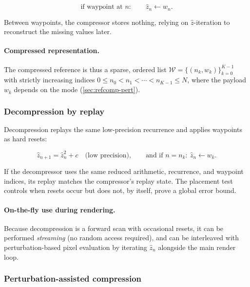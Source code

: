 \begin{equation}
  \text{if waypoint at } n:\qquad \hat z_n \leftarrow w_n.
  \label{eq:waypoint-reset}
\end{equation}

Between waypoints, the compressor stores nothing, relying on \(\hat z\)-iteration
to reconstruct the missing values later.

\paragraph{Compressed representation.}
The compressed reference is thus a sparse, ordered list
\(
\mathcal{W} = \{(n_k, w_k)\}_{k=0}^{K-1}
\)
with strictly increasing indices \(0 \le n_0 < n_1 < \cdots < n_{K-1} \le N\),
where the payload \(w_k\) depends on the mode (\cref{sec:refcomp-pert}).

\subsubsection{Decompression by replay}

Decompression replays the same low-precision recurrence and applies waypoints as
hard resets:

\begin{equation}
  \hat z_{n+1} = \hat z_n^2 + c \quad\text{(low precision)},\qquad
  \text{and if } n = n_k:\ \hat z_n \leftarrow w_k.
  \label{eq:decompress-replay}
\end{equation}

If the decompressor uses the same reduced arithmetic, recurrence, and waypoint
indices, its replay matches the compressor's replay state.  The placement test
controls when resets occur but does not, by itself, prove a global error bound.

\paragraph{On-the-fly use during rendering.}
Because decompression is a forward scan with occasional resets, it can be
performed \emph{streaming} (no random access required), and can be interleaved
with perturbation-based pixel evaluation by iterating \(\hat z_n\) alongside the
main render loop.

\subsubsection{Perturbation-assisted compression}

